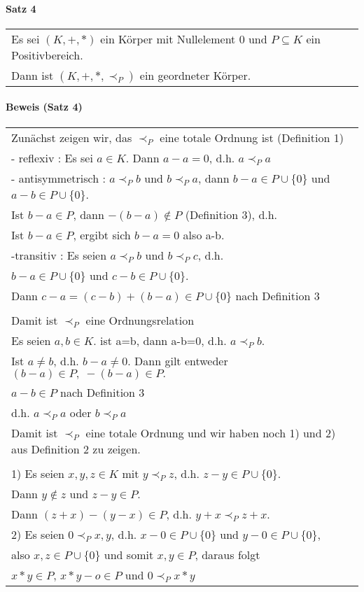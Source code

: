 \documentclass[a4paper]{scrartcl}
\begin{document}
\paragraph{Satz 4}
\begin{tabbing}
\begin{tabular}{l}
Es sei $(K,+,*)$ ein Körper mit Nullelement 0 und $P \subseteq K$ ein Positivbereich.\\
Dann ist $(K,+,*,\prec_P)$ ein geordneter Körper.
\end{tabular}
\end{tabbing}

\paragraph{Beweis (Satz 4)}
\begin{tabbing}
\begin{tabular}{l}
Zunächst zeigen wir, das $\prec_P$ eine totale Ordnung ist (Definition 1)\\
- reflexiv : Es sei $a\in K$. Dann $a-a=0$, d.h. $a \prec_P a$ \\
- antisymmetrisch : $a \prec_P b$ und $b \prec_P a$, dann $b-a\in P\cup\{ 0\}$ und $a-b\in P\cup \{ 0\}$.\\
Ist $b-a\in P$, dann $-(b-a)\notin P$ (Definition 3), d.h.\\
Ist $b-a\in P$, ergibt sich $b-a=0$ also a-b.\\
-transitiv : Es seien $a\prec_P b$ und $b\prec_P c$, d.h.\\
$b-a\in P\cup\{ 0\}$ und $c-b\in P\cup\{ 0\}$.\\
Dann $c-a=(c-b) + (b-a)\in P\cup\{ 0\}$ nach Definition 3\\
\\
Damit ist $\prec_P$ eine Ordnungsrelation\\
Es seien $a,b\in K.$ ist a=b, dann a-b=0, d.h. $a \prec_P b$.\\
Ist $a \neq b$, d.h. $b-a \neq 0$. Dann gilt entweder $(b-a)\in P,\;-(b-a)\in P.$\\
$a-b\in P$ nach Definition 3\\
d.h. $a \prec_P a$ oder $b \prec_P a$\\
Damit ist $\prec_P$ eine totale Ordnung und wir haben noch 1) und 2) aus Definition 2 zu zeigen.\\
\\
1) Es seien $x,y,z\in K$ mit $y \prec_P z$, d.h. $z-y\in P\cup\{ 0\}$.\\
Dann $y \notin z$ und $z-y\in P$.\\
Dann $(z + x) - (y-x)\in P$, d.h. $y+x \prec_P z+x.$\\
2) Es seien $0 \prec_P x,y$, d.h. $x-0\in P\cup \{ 0\}$ und $y-0\in P\cup\{ 0\}$,\\
also $x,z \in P\cup\{ 0\}$ und somit $x,y\in P$, daraus folgt \\
$x*y\in P$, $x*y-o\in P$ und $0 \prec_P x*y$
\end{tabular}
\end{tabbing}
\end{document}
